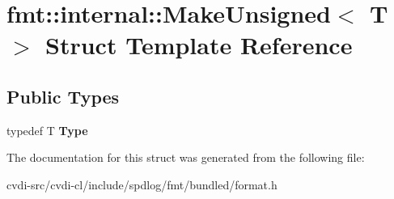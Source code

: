 \hypertarget{structfmt_1_1internal_1_1MakeUnsigned}{}\section{fmt\+:\+:internal\+:\+:Make\+Unsigned$<$ T $>$ Struct Template Reference}
\label{structfmt_1_1internal_1_1MakeUnsigned}
\subsection*{Public Types}
\begin{DoxyCompactItemize}
\item 
typedef T {\bfseries Type}\hypertarget{structfmt_1_1internal_1_1MakeUnsigned_a57cbf18702f14a837ba104412394bfba}{}\label{structfmt_1_1internal_1_1MakeUnsigned_a57cbf18702f14a837ba104412394bfba}

\end{DoxyCompactItemize}


The documentation for this struct was generated from the following file\+:\begin{DoxyCompactItemize}
\item 
cvdi-\/src/cvdi-\/cl/include/spdlog/fmt/bundled/format.\+h\end{DoxyCompactItemize}
